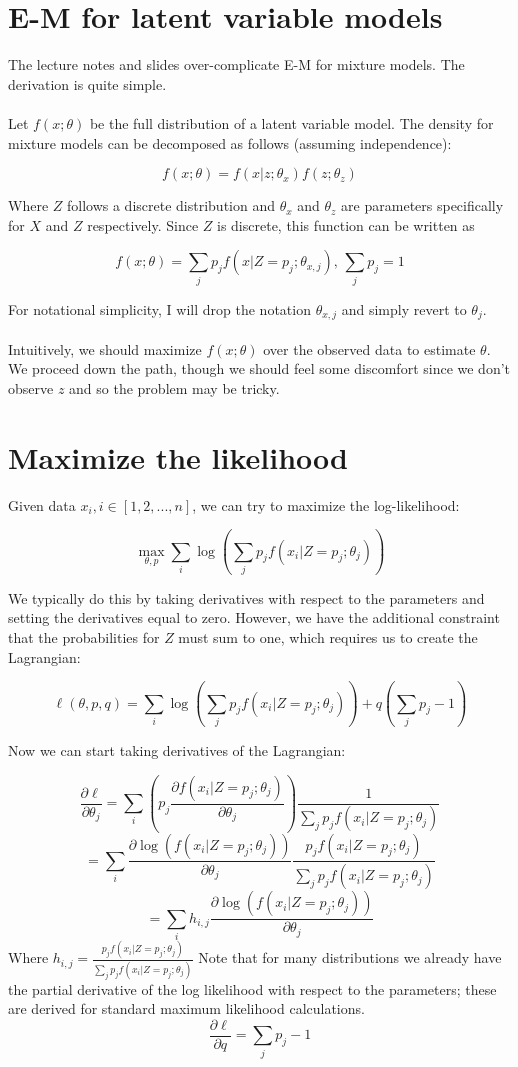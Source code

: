 \documentclass{article}
\begin{document}
\section{E-M for latent variable models}

The lecture notes and slides over-complicate E-M for mixture models.  The derivation is quite simple.
\\
\\

Let \(f(x; \theta)\) be the full distribution of a latent variable model.  The density for mixture models can be decomposed as follows (assuming independence):

\[f(x; \theta)=f(x|z; \theta_x)f(z; \theta_z )\] 

Where \(Z\) follows a discrete distribution and \(\theta_x\) and \(\theta_z\) are parameters specifically for \(X\) and \(Z\) respectively.  Since \(Z\) is discrete, this function can be written as 

\[f(x; \theta)=\sum_j p_j f(x|Z=p_j; \theta_{x, j}),\,\sum_j p_j =1\]

For notational simplicity, I will drop the notation \(\theta_{x, j}\) and simply revert to \(\theta_j\).
\\
\\
Intuitively, we should maximize \(f(x; \theta)\) over the observed data to estimate \(\theta\).  We proceed down the path, though we should feel some discomfort since we don't observe \(z\) and so the problem may be tricky.

\section{Maximize the likelihood}

Given data \(x_i, i\in [1, 2, ..., n]\), we can try to maximize the log-likelihood:

\[\max_{\theta, p} \sum_i \log\left(\sum_j p_j f(x_i|Z=p_j; \theta_j)\right)\]
 
We typically do this by taking derivatives with respect to the parameters and setting the derivatives equal to zero.  However, we have the additional constraint that the probabilities for \(Z\) must sum to one, which requires us to create the Lagrangian:

\[\ell(\theta, p, q)=\sum_i \log\left(\sum_j p_j f(x_i|Z=p_j; \theta_j)\right)+q\left(\sum_j p_j-1\right)\]

Now we can start taking derivatives of the Lagrangian:

\[\frac{\partial \ell}{\partial \theta_j}=\sum_i \left(p_j \frac{\partial f(x_i|Z=p_j; \theta_j)}{\partial \theta_j} \right) \frac{1}{\sum_j p_j f(x_i|Z=p_j; \theta_j)} \]
\[=\sum_i \frac{\partial \log\left(f(x_i|Z=p_j; \theta_j)\right)}{\partial \theta_j} \frac{p_jf(x_i|Z=p_j; \theta_j)} {\sum_j p_j f(x_i|Z=p_j; \theta_j)}\]
\[=\sum_i h_{i,j} \frac{\partial \log\left(f(x_i|Z=p_j; \theta_j)\right)}{\partial \theta_j}\]
Where \(h_{i,j}=\frac{p_jf(x_i|Z=p_j; \theta_j)} {\sum_j p_j f(x_i|Z=p_j; \theta_j)}\)
Note that for many distributions we already have the partial derivative of the log likelihood with respect to the parameters; these are derived for standard maximum likelihood calculations.
\[\frac{\partial \ell}{\partial q}=\sum_j p_j-1\]
\end{document}
